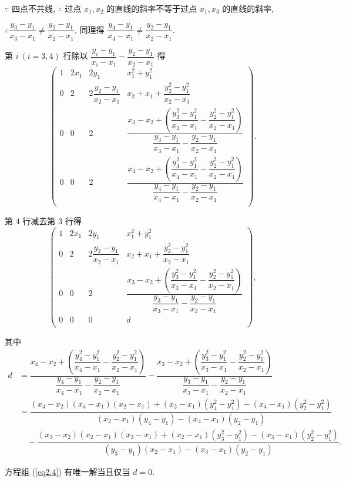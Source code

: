 \documentclass[color=black,device=normal,lang=cn,mode=geye]{elegantnote}
\begin{document}
\begin{solution}
    $\because$ 四点不共线, $\therefore$ 过点 $x_1,x_2$ 的直线的斜率不等于过点 $x_1,x_3$ 的直线的斜率,
    
    $\therefore\dfrac{y_3-y_1}{x_3-x_1}\neq\dfrac{y_2-y_1}{x_2-x_1}$, 同理得 $\dfrac{y_4-y_1}{x_4-x_1}\neq\dfrac{y_2-y_1}{x_2-x_1}$.
    
    第 $i\ (i=3,4)$ 行除以 $\dfrac{y_i-y_1}{x_i-x_1}-\dfrac{y_2-y_1}{x_2-x_1}$ 得
    \[\begin{pmatrix}
        1 & 2x_1 & 2y_1 & x_1^2+y_1^2 \\
        0 & 2 & 2\dfrac{y_2-y_1}{x_2-x_1} & x_2+x_1+\dfrac{y_2^2-y_1^2}{x_2-x_1} \\[16pt]
        0 & 0 & 2 & \dfrac{x_3-x_2+\left(\dfrac{y_3^2-y_1^2}{x_3-x_1}-\dfrac{y_2^2-y_1^2}{x_2-x_1}\right)}{\dfrac{y_3-y_1}{x_3-x_1}-\dfrac{y_2-y_1}{x_2-x_1}} \\[16pt]
        0 & 0 & 2 & \dfrac{x_4-x_2+\left(\dfrac{y_4^2-y_1^2}{x_4-x_1}-\dfrac{y_2^2-y_1^2}{x_2-x_1}\right)}{\dfrac{y_4-y_1}{x_4-x_1}-\dfrac{y_2-y_1}{x_2-x_1}} \\[16pt]
    \end{pmatrix}.\]

    第 $4$ 行减去第 $3$ 行得
    \[\begin{pmatrix}
        1 & 2x_1 & 2y_1 & x_1^2+y_1^2 \\
        0 & 2 & 2\dfrac{y_2-y_1}{x_2-x_1} & x_2+x_1+\dfrac{y_2^2-y_1^2}{x_2-x_1} \\[8pt]
        0 & 0 & 2 & \dfrac{x_3-x_2+\left(\dfrac{y_3^2-y_1^2}{x_3-x_1}-\dfrac{y_2^2-y_1^2}{x_2-x_1}\right)}{\dfrac{y_3-y_1}{x_3-x_1}-\dfrac{y_2-y_1}{x_2-x_1}} \\[16pt]
        0 & 0 & 0 & d \\
    \end{pmatrix},\]

    其中
    \begin{align*}
        d & =\dfrac{x_4-x_2+\left(\dfrac{y_4^2-y_1^2}{x_4-x_1}-\dfrac{y_2^2-y_1^2}{x_2-x_1}\right)}{\dfrac{y_4-y_1}{x_4-x_1}-\dfrac{y_2-y_1}{x_2-x_1}}-\dfrac{x_3-x_2+\left(\dfrac{y_3^2-y_1^2}{x_3-x_1}-\dfrac{y_2^2-y_1^2}{x_2-x_1}\right)}{\dfrac{y_3-y_1}{x_3-x_1}-\dfrac{y_2-y_1}{x_2-x_1}} \\
        & =\dfrac{(x_4-x_2)(x_4-x_1)(x_2-x_1)+(x_2-x_1)(y_4^2-y_1^2)-(x_4-x_1)(y_2^2-y_1^2)}{(x_2-x_1)(y_4-y_1)-(x_4-x_1)(y_2-y_1)} \\
        & \quad-\dfrac{(x_3-x_2)(x_2-x_1)(x_3-x_1)+(x_2-x_1)(y_3^2-y_1^2)-(x_3-x_1)(y_2^2-y_1^2)}{(y_3-y_1)(x_2-x_1)-(x_3-x_1)(y_2-y_1)}.
    \end{align*}

    方程组 (\ref{eq2.4}) 有唯一解当且仅当 $d=0$.
\end{solution}
\end{document}
